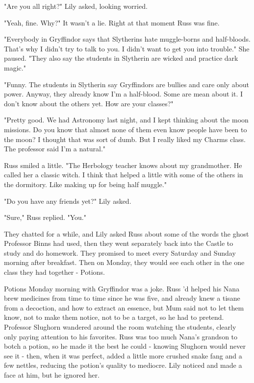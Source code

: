 "Are you all right?" Lily asked, looking worried.

"Yeah, fine. Why?" It wasn't a lie. Right at that moment Russ was fine.

"Everybody in Gryffindor says that Slytherins hate muggle-borns and half-bloods. That's why I didn't try to talk to you. I didn't want to get you into trouble." She paused. "They also say the students in Slytherin are wicked and practice dark magic."

"Funny. The students in Slytherin say Gryffindors are bullies and care only about power. Anyway, they already know I'm a half-blood. Some are mean about it. I don't know about the others yet. How are your classes?"

"Pretty good. We had Astronomy last night, and I kept thinking about the moon missions. Do you know that almost none of them even know people have been to the moon? I thought that was sort of dumb. But I really liked my Charms class. The professor said I'm a natural."

Russ smiled a little. "The Herbology teacher knows about my grandmother. He called her a classic witch. I think that helped a little with some of the others in the dormitory. Like making up for being half muggle."

"Do you have any friends yet?" Lily asked.

"Sure," Russ replied. "You."

They chatted for a while, and Lily asked Russ about some of the words the ghost Professor Binns had used, then they went separately back into the Castle to study and do homework. They promised to meet every Saturday and Sunday morning after breakfast. Then on Monday, they would see each other in the one class they had together - Potions.

Potions Monday morning with Gryffindor was a joke. Russ 'd helped his Nana brew medicines from time to time since he was five, and already knew a tisane from a decoction, and how to extract an essence, but Mum said not to let them know, not to make them notice, not to be a target, so he had to pretend. Professor Slughorn wandered around the room watching the students, clearly only paying attention to his favorites. Russ was too much Nana's grandson to botch a potion, so he made it the best he could - knowing Slughorn would never see it - then, when it was perfect, added a little more crushed snake fang and a few nettles, reducing the potion's quality to mediocre. Lily noticed and made a face at him, but he ignored her.

